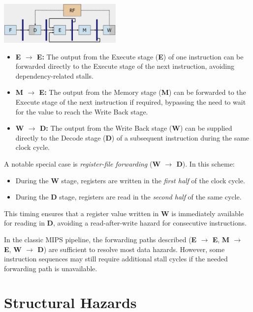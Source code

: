 \begin{center}
    \includegraphics[width=0.45\textwidth]{chapters/chapter4c/images/classic_mips.png}
\end{center}
\begin{itemize}
  \item \textbf{E $\rightarrow$ E:} The output from the Execute stage (\textbf{E}) of one instruction can be forwarded directly to the Execute stage of the next instruction, avoiding dependency-related stalls.
  \item \textbf{M $\rightarrow$ E:} The output from the Memory stage (\textbf{M}) can be forwarded to the Execute stage of the next instruction if required, bypassing the need to wait for the value to reach the Write Back stage.
  \item \textbf{W $\rightarrow$ D:} The output from the Write Back stage (\textbf{W}) can be supplied directly to the Decode stage (\textbf{D}) of a subsequent instruction during the same clock cycle.
\end{itemize}

\noindent
A notable special case is \emph{register-file forwarding} (\textbf{W $\rightarrow$ D}). In this scheme:
\begin{itemize}
  \item During the \textbf{W} stage, registers are written in the \textit{first half} of the clock cycle.
  \item During the \textbf{D} stage, registers are read in the \textit{second half} of the same cycle.
\end{itemize}
\noindent
This timing ensures that a register value written in \textbf{W} is immediately available for reading in \textbf{D}, avoiding a read-after-write hazard for consecutive instructions.

\noindent
In the classic MIPS pipeline, the forwarding paths described (\textbf{E $\rightarrow$ E}, \textbf{M $\rightarrow$ E}, \textbf{W $\rightarrow$ D}) are sufficient to resolve most data hazards. However, some instruction sequences may still require additional stall cycles if the needed forwarding path is unavailable.
\newpage
\section{Structural Hazards}

